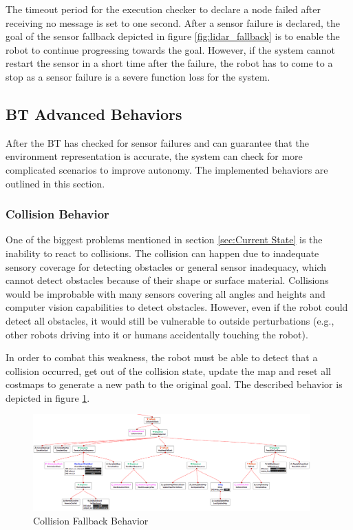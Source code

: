 The timeout period for the execution checker to declare a node failed after receiving no message is set to one second. After a sensor failure is declared, the goal of the sensor fallback depicted in figure \ref{fig:lidar_fallback} is to enable the robot to continue progressing towards the goal. However, if the system cannot restart the sensor in a short time after the failure, the robot has to come to a stop as a sensor failure is a severe function loss for the system.

\subsection{BT Advanced Behaviors}

After the BT has checked for sensor failures and can guarantee that the environment representation is accurate, the system can check for more complicated scenarios to improve autonomy. The implemented behaviors are outlined in this section. 

\subsubsection{Collision Behavior}

One of the biggest problems mentioned in section \ref{sec:Current State} is the inability to react to collisions. The collision can happen due to inadequate sensory coverage for detecting obstacles or general sensor inadequacy, which cannot detect obstacles because of their shape or surface material. Collisions would be improbable with many sensors covering all angles and heights and computer vision capabilities to detect obstacles. However, even if the robot could detect all obstacles, it would still be vulnerable to outside perturbations (e.g., other robots driving into it or humans accidentally touching the robot). 

In order to combat this weakness, the robot must be able to detect that a collision occurred, get out of the collision state, update the map and reset all costmaps to generate a new path to the original goal. The described behavior is depicted in figure \ref{fig:collision_fallback}.

\begin{figure}[ht]
	\centering
	\includegraphics[width=0.95\textwidth]{images/collision_fallback_inverted.png}
	\caption{Collision Fallback Behavior}
	\label{fig:collision_fallback}
\end{figure}

